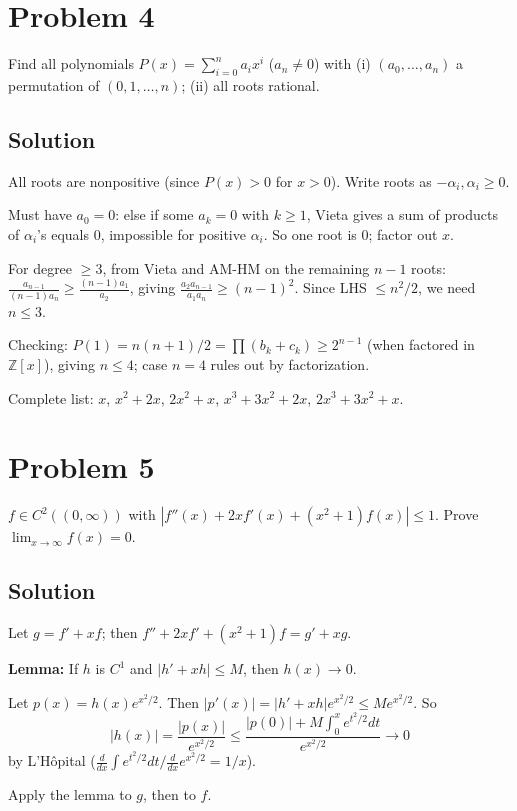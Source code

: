 \documentclass{article}
\begin{document}
\section*{Problem 4}
Find all polynomials $P(x) = \sum_{i=0}^n a_i x^i$ ($a_n \ne 0$) with (i) $(a_0, \ldots, a_n)$ a permutation of $(0, 1, \ldots, n)$; (ii) all roots rational.

\subsection*{Solution}
All roots are nonpositive (since $P(x) > 0$ for $x > 0$). Write roots as $-\alpha_i, \alpha_i \ge 0$.

Must have $a_0 = 0$: else if some $a_k = 0$ with $k \ge 1$, Vieta gives a sum of products of $\alpha_i$'s equals 0, impossible for positive $\alpha_i$. So one root is $0$; factor out $x$.

For degree $\ge 3$, from Vieta and AM-HM on the remaining $n - 1$ roots: $\tfrac{a_{n-1}}{(n-1) a_n} \ge \tfrac{(n-1) a_1}{a_2}$, giving $\tfrac{a_2 a_{n-1}}{a_1 a_n} \ge (n-1)^2$. Since LHS $\le n^2/2$, we need $n \le 3$.

Checking: $P(1) = n(n+1)/2 = \prod(b_k + c_k) \ge 2^{n-1}$ (when factored in $\mathbb{Z}[x]$), giving $n \le 4$; case $n = 4$ rules out by factorization.

Complete list: $x$, $x^2 + 2x$, $2x^2 + x$, $x^3 + 3x^2 + 2x$, $2x^3 + 3x^2 + x$.

\section*{Problem 5}
$f \in C^2((0, \infty))$ with $|f''(x) + 2x f'(x) + (x^2 + 1) f(x)| \le 1$. Prove $\lim_{x \to \infty} f(x) = 0$.

\subsection*{Solution}
Let $g = f' + xf$; then $f'' + 2xf' + (x^2 + 1)f = g' + xg$.

\textbf{Lemma:} If $h$ is $C^1$ and $|h' + xh| \le M$, then $h(x) \to 0$.

Let $p(x) = h(x) e^{x^2/2}$. Then $|p'(x)| = |h' + xh| e^{x^2/2} \le M e^{x^2/2}$. So
\[
|h(x)| = \frac{|p(x)|}{e^{x^2/2}} \le \frac{|p(0)| + M \int_0^x e^{t^2/2} dt}{e^{x^2/2}} \to 0
\]
by L'Hôpital ($\tfrac{d}{dx} \int e^{t^2/2}dt / \tfrac{d}{dx} e^{x^2/2} = 1/x$).

Apply the lemma to $g$, then to $f$.
\end{document}
